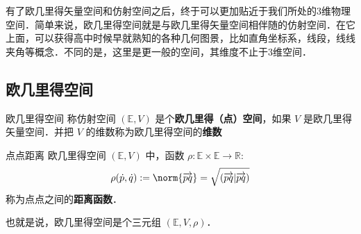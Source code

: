 
\begin{issues}
\issueDraft
\end{issues}

有了欧几里得矢量空间和仿射空间之后，终于可以更加贴近于我们所处的3维物理空间．简单来说，欧几里得空间就是与欧几里得矢量空间相伴随的仿射空间．在它上面，可以获得高中时候早就熟知的各种几何图景，比如直角坐标系，线段，线线夹角等概念．不同的是，这里是更一般的空间，其维度不止于3维空间．
\subsection{欧几里得空间}
\begin{definition}{欧几里得空间}
称仿射空间 $(\mathbb E,V)$ 是个\textbf{欧几里得（点）空间}，如果 $V$ 是欧几里得矢量空间．并把 $V$ 的维数称为欧几里得空间的\textbf{维数}
\end{definition}
\begin{definition}{点点距离}
欧几里得空间 $(\mathbb E,V)$ 中，函数 $\rho:\mathbb E\times\mathbb E\rightarrow\mathbb R$:
\begin{equation}
\rho(\dot p,\dot q):=\norm{\overrightarrow{pq}}=\sqrt{(\overrightarrow{pq}|\overrightarrow{pq})}
\end{equation}
称为点点之间的\textbf{距离函数}．
\end{definition}
也就是说，欧几里得空间是个三元组 $(\mathbb E,V,\rho)$．

